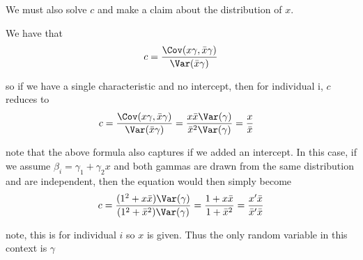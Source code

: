 We must also solve $c$ and make a claim about the distribution of $x$.

We have that
\begin{align*}
	c = \frac{\Cov (x \gamma, \bar{x} \gamma)}{ \Var( \bar{x} \gamma )}
\end{align*} 

so if we have a single characteristic and no intercept, then for individual i, $c$ reduces to
\begin{align*}
	c &= \frac{\Cov (x \gamma, \bar{x} \gamma)}{ \Var( \bar{x} \gamma )} = \frac{x \bar{x} \Var(\gamma)}{\bar{x}^2 \Var(\gamma)} = \frac{x}{\bar{x}}
\end{align*} 


note that the above formula also captures if we added an intercept. In this case, if we assume $\beta_i = \gamma_1 + \gamma_2 x$ and both gammas are drawn from the same distribution and are independent, then the equation would then simply become
\begin{align*}
	c = \frac{(1^2 + x \bar{x})\Var(\gamma)}{(1^2 + \bar{x}^2)\Var(\gamma)} = \frac{1 + x \bar{x}}{1 + \bar{x}^2} = \frac{x' \bar{x}}{\bar{x}' \bar{x}}
\end{align*} 


note, this is for individual $i$ so $x$ is given. Thus the only random variable in this context is $\gamma$

